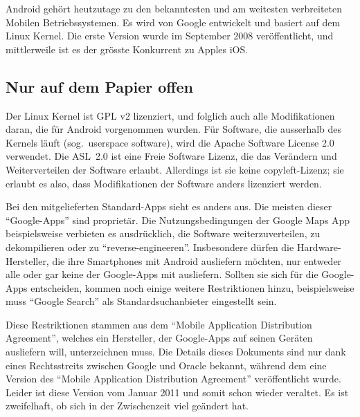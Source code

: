 Android gehört heutzutage zu den bekanntesten und am weitesten verbreiteten Mobilen Betriebssystemen. Es wird von Google entwickelt und basiert auf dem Linux Kernel. Die erste Version wurde im September 2008 veröffentlicht, und mittlerweile ist es der grösste Konkurrent zu Apples iOS.
\newline

\subsection{Nur auf dem Papier offen}
Der Linux Kernel ist GPL v2 lizenziert\thinspace\cite{online:kernel-license}, und folglich auch alle Modifikationen daran, die für Android vorgenommen wurden. Für Software, die ausserhalb des Kernels läuft (sog.\ userspace software), wird die Apache Software License 2.0 verwendet\thinspace\cite{online:android-licenses}. Die \mbox{ASL 2.0} ist eine Freie Software Lizenz, die das Verändern und Weiterverteilen der Software erlaubt. Allerdings ist sie  keine copyleft-Lizenz; sie erlaubt es also, dass Modifikationen der Software anders lizenziert werden\thinspace\cite{online:apache-license}.

Bei den mitgelieferten Standard-Apps sieht es anders aus. Die meisten dieser ``Google-Apps'' sind proprietär. Die Nutzungsbedingungen der Google Maps App beispielsweise verbieten es ausdrücklich, die Software weiterzuverteilen, zu dekompilieren oder zu ``reverse-engineeren''\thinspace\cite{online:google-maps-tos}. Insbesondere dürfen die \mbox{Hardware-Hersteller}, die ihre Smartphones mit Android ausliefern möchten, nur entweder alle oder gar keine der Google-Apps mit ausliefern. Sollten sie sich für die Google-Apps entscheiden, kommen noch einige weitere Restriktionen hinzu, beispielsweise muss ``Google Search'' als Standardsuchanbieter eingestellt sein\thinspace\cite{online:mada-leak}.

Diese Restriktionen stammen aus dem ``Mobile Application Distribution Agreement'', welches ein Hersteller, der Google-Apps auf seinen Geräten ausliefern will, unterzeichnen muss. Die Details dieses Dokuments sind nur dank eines Rechtsstreits zwischen Google und Oracle bekannt, während dem eine Version des ``Mobile Application Distribution Agreement'' veröffentlicht wurde\thinspace\cite{online:ars-mada-leak}. Leider ist diese Version vom Januar 2011 und somit schon wieder veraltet. Es ist zweifelhaft, ob sich in der Zwischenzeit viel geändert hat.
\newline

